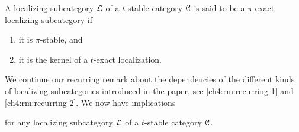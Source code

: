 



\begin{definition}
    \label{ch4:def:pi-exact-localizing-subcategory}
    A localizing subcategory $\mathcal{L}$ of a $t$-stable category $\EuScript{C}$ is said to be a $\pi$-exact localizing subcategory if 
    \begin{enumerate}
        \item it is $\pi$-stable, and
        \item it is the kernel of a $t$-exact localization. 
    \end{enumerate}
\end{definition}

\begin{remark}
    \label{ch4:rm:recurring-3}
    We continue our recurring remark about the dependencies of the different kinds of localizing subcategories introduced in the paper, see \cref{ch4:rm:recurring-1} and \cref{ch4:rm:recurring-2}. We now have implications
    \begin{center}
    \end{center}
    for any localizing subcategory $\mathcal{L}$ of a $t$-stable category $\EuScript{C}$. 
\end{remark}

